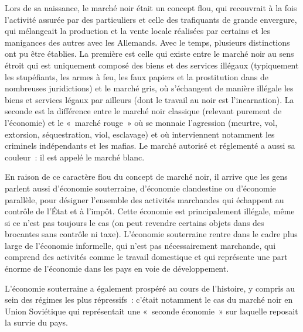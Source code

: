 Lors de sa naissance, le marché noir était un concept flou, qui recouvrait à la fois l'activité assurée par des particuliers et celle des trafiquants de grande envergure, qui mélangeait la production et la vente locale réalisées par certains et les manigances des autres avec les Allemands. Avec le temps, plusieurs distinctions ont pu être établies. La première est celle qui existe entre le marché noir au sens étroit qui est uniquement composé des biens et des services illégaux (typiquement les stupéfiants, les armes à feu, les faux papiers et la prostitution dans de nombreuses juridictions) et le marché gris, où s'échangent de manière illégale les biens et services légaux par ailleurs (dont le travail au noir est l'incarnation). La seconde est la différence entre le marché noir classique (relevant purement de l'économie) et le «~marché rouge~» où se monnaie l'agression (meurtre, vol, extorsion, séquestration, viol, esclavage) et où interviennent notamment les criminels indépendants et les mafias. Le marché autorisé et réglementé a aussi sa couleur~: il est appelé le marché blanc.

En raison de ce caractère flou du concept de marché noir, il arrive que les gens parlent aussi d'économie souterraine, d'économie clandestine ou d'économie parallèle, pour désigner l'ensemble des activités marchandes qui échappent au contrôle de l'État et à l'impôt. Cette économie est principalement illégale, même si ce n'est pas toujours le cas (on peut revendre certains objets dans des brocantes sans contrôle ni taxe). L'économie souterraine rentre dans le cadre plus large de l'économie informelle, qui n'est pas nécessairement marchande, qui comprend des activités comme le travail domestique et qui représente une part énorme de l'économie dans les pays en voie de développement.

L'économie souterraine a également prospéré au cours de l'histoire, y compris au sein des régimes les plus répressifs~: c'était notamment le cas du marché noir en Union Soviétique qui représentait une «~seconde économie~» sur laquelle reposait la survie du pays.

